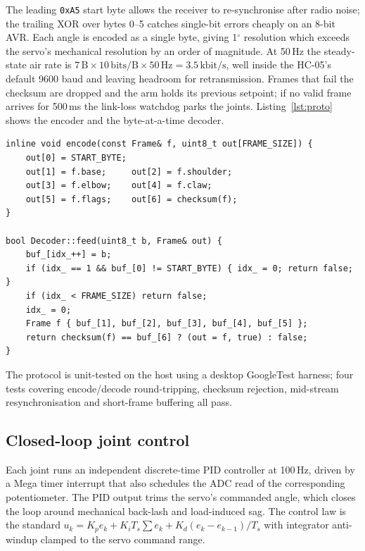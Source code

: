 The leading \texttt{0xA5} start byte allows the receiver to
re-synchronise after radio noise; the trailing XOR over bytes 0--5
catches single-bit errors cheaply on an 8-bit AVR. Each angle is
encoded as a single byte, giving 1$^\circ$ resolution which exceeds
the servo's mechanical resolution by an order of magnitude. At
50\,Hz the steady-state air rate is
\(7\,\text{B}\times 10\,\text{bits/B}\times 50\,\text{Hz} = 3.5\,\text{kbit/s}\),
well inside the HC-05's default 9600 baud and leaving headroom for
retransmission. Frames that fail the checksum are dropped and the
arm holds its previous setpoint; if no valid frame arrives for
500\,ms the link-loss watchdog parks the joints. Listing~\ref{lst:proto}
shows the encoder and the byte-at-a-time decoder.

\begin{lstlisting}[caption={Frame encoder/decoder (excerpt from
\texttt{lib/ArmProtocol/ArmProtocol.h}).},label=lst:proto]
inline void encode(const Frame& f, uint8_t out[FRAME_SIZE]) {
    out[0] = START_BYTE;
    out[1] = f.base;     out[2] = f.shoulder;
    out[3] = f.elbow;    out[4] = f.claw;
    out[5] = f.flags;    out[6] = checksum(f);
}

bool Decoder::feed(uint8_t b, Frame& out) {
    buf_[idx_++] = b;
    if (idx_ == 1 && buf_[0] != START_BYTE) { idx_ = 0; return false; }
    if (idx_ < FRAME_SIZE) return false;
    idx_ = 0;
    Frame f { buf_[1], buf_[2], buf_[3], buf_[4], buf_[5] };
    return checksum(f) == buf_[6] ? (out = f, true) : false;
}
\end{lstlisting}

The protocol is unit-tested on the host using a desktop GoogleTest
harness; four tests covering encode/decode round-tripping, checksum
rejection, mid-stream resynchronisation and short-frame buffering
all pass.

\subsection{Closed-loop joint control}
\label{sec:closedloop}
Each joint runs an independent discrete-time PID controller at
100\,Hz, driven by a Mega timer interrupt that also schedules the ADC
read of the corresponding potentiometer. The PID output trims the
servo's commanded angle, which closes the loop around mechanical
back-lash and load-induced sag. The control law is the standard
\(u_k = K_p e_k + K_i T_s \sum e_k + K_d (e_k - e_{k-1})/T_s\) with
integrator anti-windup clamped to the servo command range.

